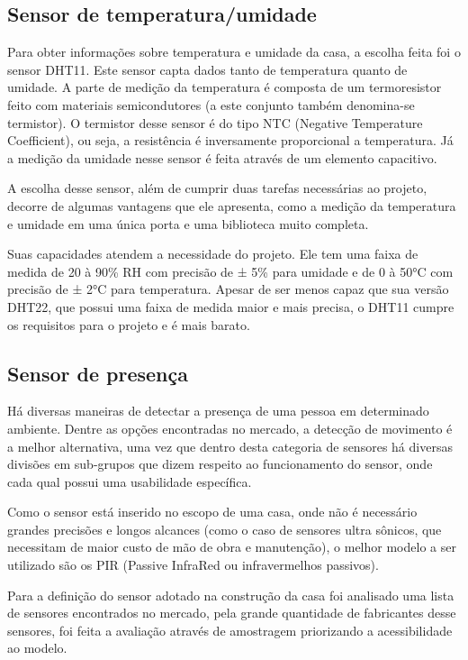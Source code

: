 \subsection{Sensor de temperatura/umidade}
\par Para obter informações sobre temperatura e umidade da casa, a escolha feita foi o sensor DHT11. Este sensor capta dados tanto de temperatura quanto de umidade. A parte de medição da temperatura é composta de um termoresistor feito com materiais semicondutores (a este conjunto também denomina-se termistor). O termistor desse sensor é do tipo NTC (Negative Temperature Coefficient), ou seja, a resistência é inversamente proporcional a temperatura. Já a medição da umidade nesse sensor é feita através de um elemento capacitivo.
\par A escolha desse sensor, além de cumprir duas tarefas necessárias ao projeto, decorre de algumas vantagens que ele apresenta, como a medição da temperatura e umidade em uma única porta e uma biblioteca muito completa.
\par Suas capacidades atendem a necessidade do projeto. Ele tem uma faixa de medida de 20 à 90\% RH com precisão de ± 5\% para umidade e de 0 à 50°C com precisão de ± 2°C para temperatura. Apesar de ser menos capaz que sua versão DHT22, que possui uma faixa de medida maior e mais precisa, o DHT11 cumpre os requisitos para o projeto e é mais barato.

\subsection{Sensor de presença}
\par Há diversas maneiras de detectar a presença de uma pessoa em determinado ambiente. Dentre as opções encontradas no mercado, a detecção de movimento é a melhor alternativa, uma vez que dentro desta categoria de sensores há diversas divisões em sub-grupos que dizem respeito ao funcionamento do sensor, onde cada qual possui uma usabilidade específica.
\par Como o sensor está inserido no escopo de uma casa, onde não é necessário grandes precisões e longos alcances (como o caso de sensores ultra sônicos, que necessitam de maior custo de mão de obra e manutenção), o melhor modelo a ser utilizado são os PIR (Passive InfraRed ou infravermelhos passivos).
\par Para a definição do sensor adotado na construção da casa foi analisado uma lista de sensores encontrados no mercado, pela grande quantidade de fabricantes desse sensores, foi feita a avaliação através de amostragem priorizando a acessibilidade ao modelo.

